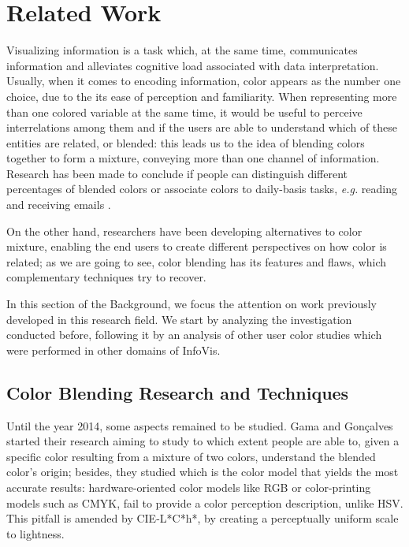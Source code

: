 \section{Related Work}
\label{sec:related_work}
%
Visualizing information is a task which, at the same time, communicates information and alleviates
cognitive load associated with data interpretation. Usually, when it comes to encoding information, color
appears as the number one choice, due to the its ease of perception and familiarity. When representing
more than one colored variable at the same time, it would be useful to perceive interrelations among
them and if the users are able to understand which of these entities are related, or blended: this leads
us to the idea of blending colors together to form a mixture, conveying more than one channel of information.
Research has been made to conclude if people can distinguish different percentages of blended colors or
associate colors to daily-basis tasks, \emph{e.g.} reading and receiving emails \cite{Gama20143}. \par
On the other hand, researchers have been developing alternatives to color mixture, enabling the end users
to create different perspectives on how color is related; as we are going to see, color blending has its
features and flaws, which complementary techniques try to recover. \par
%
In this section of the Background, we focus the attention on work previously developed in this research field. We
start by analyzing the investigation conducted before, following it by an analysis of other user color studies
which were performed in other domains of InfoVis.
%
\subsection{Color Blending Research and Techniques}
\label{subsec:colorblending}
%
Until the year 2014, some aspects remained to be studied. Gama and Gonçalves started their research \cite{Gama20141}
aiming to study to which extent people are able to, given a specific color resulting from a mixture of
two colors, understand the blended color’s origin; besides, they studied which is the color model that
yields the most accurate results: hardware-oriented color models like RGB or color-printing models such
as CMYK, fail to provide a color perception description, unlike HSV. This pitfall is amended by CIE-L*C*h*,
by creating a perceptually uniform scale to lightness.  \par
%

